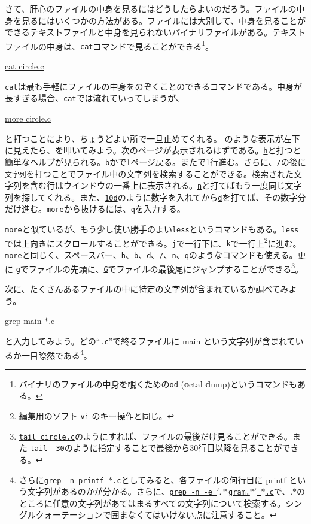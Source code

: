 さて、肝心のファイルの中身を見るにはどうしたらよいのだろう。ファイルの中身を見るにはいくつかの方法がある。ファイルには大別して、中身を見ることができるテキストファイルと中身を見られないバイナリファイルがある。テキストファイルの中身は、{\tt cat}コマンドで見ることができる\footnote{バイナリのファイルの中身を覗くための{\tt od} ({\bf o}ctal {\bf d}ump)というコマンドもある。}。
\begin{commandline2}
\prompt \underline{cat circle.c}
\end{commandline2} \noindent
{\tt cat}は最も手軽にファイルの中身をのぞくことのできるコマンドである。中身が長すぎる場合、{\tt cat}では流れていってしまうが、
\begin{commandline2}
\prompt \underline{more circle.c}
\end{commandline2} \noindent
と打つことにより、ちょうどよい所で一旦止めてくれる。 のような表示が左下に見えたら、\spc を叩いてみよう。次のページが表示されるはずである。\underline{\tt h}と打つと簡単なヘルプが見られる。\underline{\tt b}かで1ページ戻る。また\ret で1行進む。さらに、\underline{\tt /}の後に\underline{\tt 文字列}を打つことでファイル中の文字列を検索することができる。検索された文字列を含む行はウインドウの一番上に表示される。\underline{\tt n}と打てばもう一度同じ文字列を探してくれる。また、\underline{\tt 10d}のように数字を入れてから\underline{\tt d}を打てば、その数字分だけ進む。{\tt more}から抜けるには、\underline{\tt q}を入力する。

{\tt more}と似ているが、もう少し使い勝手のよい{\tt less}\label{sect:less}というコマンドもある。{\tt less}では上向きにスクロールすることができる。\underline{\tt j}で一行下に、\underline{\tt k}で一行上\footnote{編集用のソフト {\tt vi} のキー操作と同じ。}に進む。{\tt more}と同じく、スペースバー、\underline{\tt h}、\underline{\tt b}、\underline{\tt d}、\underline{\tt /}、\underline{\tt n}、\underline{\tt q}のようなコマンドも使える。更に \underline{\tt g}でファイルの先頭に、\underline{\tt G}でファイルの最後尾にジャンプすることができる\footnote{{\tt \underline{tail circle.c}}のようにすれば、ファイルの最後だけ見ることができる。また \underline{\tt tail -30}のように指定することで最後から30行目以降を見ることができる。}。

次に、たくさんあるファイルの中に特定の文字列が含まれているか調べてみよう。
\begin{commandline2}
\prompt \underline{grep main $\ast$.c}
\end{commandline2} \noindent
と入力してみよう。どの``{\tt .c}''で終るファイルに main という文字列が含まれているか一目瞭然である\footnote{さらに\texttt{\underline{grep -n printf $\ast$.c}}としてみると、各ファイルの何行目に printf という文字列があるのかが分かる。さらに、\texttt{\underline{grep -n -e $'.\ast$gram.$\ast'$ $\ast$.c}}で、.$\ast$のところに任意の文字列があてはまるすべての文字列について検索する。シングルクォーテーションで囲まなくてはいけない点に注意すること。}。

